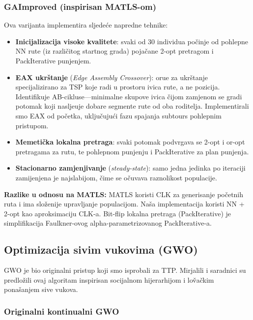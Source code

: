 \documentclass[12pt,a4paper]{article}
\begin{document}
\subsubsection{GAImproved (inspirisan MATLS-om)}

Ova varijanta implementira sljede\'{c}e napredne tehnike:
\begin{itemize}
    \item \textbf{Inicijalizacija visoke kvalitete}: svaki od 30 individua po\v{c}inje od pohlepne NN rute (iz razli\v{c}itog startnog grada) poja\v{c}ane 2-opt pretragom i PackIterative punjenjem.
    \item \textbf{EAX ukrštanje} (\textit{Edge Assembly Crossover}): oru\dj{}e za ukrštanje specijalizirano za TSP koje radi u prostoru ivica rute, a ne pozicija. Identifikuje AB-cikluse---minimalne skupove ivica \v{c}ijom zamjenom se gradi potomak koji naslje\dj{}uje dobare segmente rute od oba roditelja. Implementirali smo EAX od po\v{c}etka, uklju\v{c}uju\'{c}i fazu spajanja subtours pohlepnim pristupom.
    \item \textbf{Memetička lokalna pretraga}: svaki potomak podvrgava se 2-opt i or-opt pretragama za rutu, te pohlepnom punjenju i PackIterative za plan punjenja.
    \item \textbf{Stacionarno zamjenjivanje} (\textit{steady-state}): samo jedna jedinka po iteraciji zamijenjena je najslabijom, \v{c}ime se o\v{c}uvava raznolikost populacije.
\end{itemize}

\textbf{Razlike u odnosu na MATLS:} MATLS koristi CLK za generisanje po\v{c}etnih ruta i ima slo\v{z}enije upravljanje populacijom. Na\v{s}a implementacija koristi NN + 2-opt kao aproksimaciju CLK-a. Bit-flip lokalna pretraga (PackIterative) je simplifikacija Faulkner-ovog alpha-parametrizovanog PackIterative-a.

\subsection{Optimizacija sivim vukovima (GWO)}

GWO je bio originalni pristup koji smo isprobali za TTP. Mirjalili i saradnici \cite{mirjalili2014} su predlo\v{z}ili ovaj algoritam inspirisan socijalnom hijerarhijom i lo\v{v}a\v{c}kim pona\v{s}anjem sive vukova.

\subsubsection{Originalni kontinualni GWO}
\end{document}
